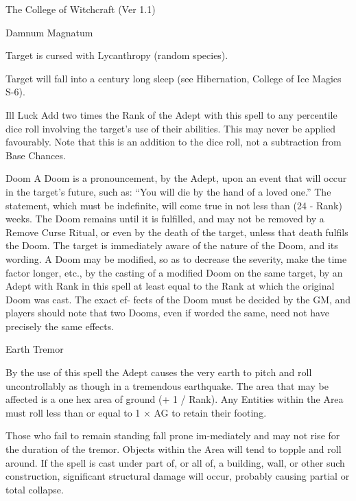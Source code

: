 \begin{Chapter}{The College of Witchcraft (Ver 1.1)}
\begin{spell}[S-10]{Damnum Magnatum}
\begin{effects}
\begin{Description}
\begin{Itemize}
\item Target is cursed with Lycanthropy (random species).

\item Target will fall into a century long sleep (see Hibernation,
  College of Ice Magics S-6).
\end{Itemize}

\item[Ill Luck] Add two times the Rank of the Adept with this spell to
  any percentile dice roll involving the target’s use of their
  abilities.  This may never be applied favourably. Note that this is
  an addition to the dice roll, not a subtraction from Base Chances.

\item[Doom] A Doom is a pronouncement, by the Adept, upon an event
  that will occur in the target’s future, such as: “You will die by
  the hand of a loved one.”  The statement, which must be indefinite,
  will come true in not less than (24 - Rank) weeks. The Doom remains
  until it is fulfilled, and may not be removed by a Remove Curse
  Ritual, or even by the death of the target, unless that death
  fulfils the Doom.  The target is immediately aware of the nature of
  the Doom, and its wording. A Doom may be modified, so as to decrease
  the severity, make the time factor longer, etc., by the casting of a
  modified Doom on the same target, by an Adept with Rank in this
  spell at least equal to the Rank at which the original Doom was
  cast.  The exact ef- fects of the Doom must be decided by the GM,
  and players should note that two Dooms, even if worded the same,
  need not have precisely the same effects.
\end{Description}
\end{effects}
\end{spell}

\begin{spell}[S-11]{Earth Tremor}

\begin{effects}
By the use of this spell the Adept causes the very earth to pitch and
roll uncontrollably as though in a tremendous earthquake.  The area
that may be affected is a one hex area of ground (+ 1 / Rank). Any
Entities within the Area must roll less than or equal to 1 × AG to
retain their footing.

Those who fail to remain standing fall prone im-mediately and may not
rise for the duration of the tremor. Objects within the Area will tend
to topple and roll around. If the spell is cast under part of, or all
of, a building, wall, or other such construction, significant
structural damage will occur, probably causing partial or total
collapse.
\end{effects}
\end{spell}


\end{Chapter}

